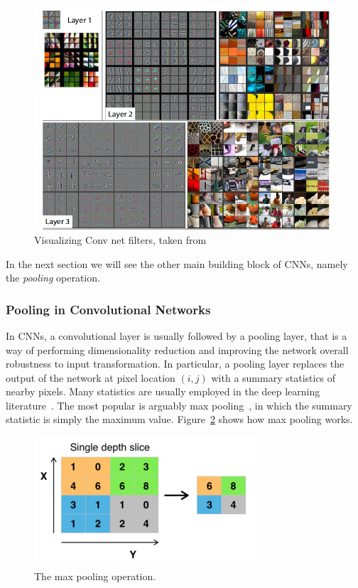 \documentclass[../main.tex]{subfiles}
\begin{document}
    \begin{figure}[h!]
    	\includegraphics[width=\linewidth]{img/learned-conv-filters.png}
        \caption{Visualizing Conv net filters, taken from~\cite{zeiler13}}\label{fig:conv-filters}
	\end{figure}

    In the next section we will see the other main building block of CNNs, namely the \textit{pooling} operation.

    \subsubsection{Pooling in Convolutional Networks}
    In CNNs, a convolutional layer is usually followed by a pooling layer, that is a way of performing dimensionality reduction
    and improving the network overall robustness to input transformation. In particular, a pooling layer replaces the output of the
    network at pixel location $(i, j)$ with a summary statistics of nearby pixels. Many statistics are usually employed in the deep learning
    literature~\cite{scherer2010evaluation}. The most popular is arguably max pooling~\cite{nagi2011max}, in which the summary statistic
	is simply the maximum value. Figure~\ref{fig:max-pooling} shows how max pooling works.

    \begin{figure}[h!]
        \centering
    	\includegraphics[width=.6\linewidth]{img/max-pooling.png}
        \caption{The max pooling operation.}\label{fig:max-pooling}
	\end{figure}
\end{document}
